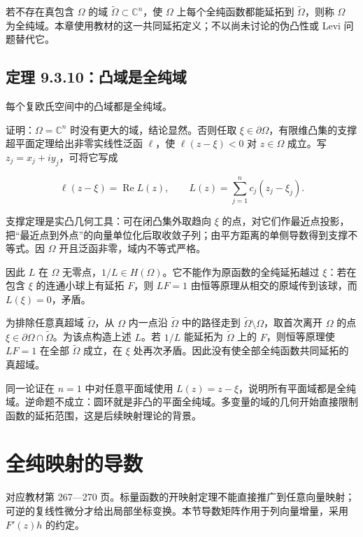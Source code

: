 \documentclass[11pt,a4paper]{article}
\begin{document}
若不存在真包含 \(\Omega\) 的域
\(\widetilde\Omega\subset\mathbb C^n\)，使 \(\Omega\)
上每个全纯函数都能延拓到 \(\widetilde\Omega\)，则称 \(\Omega\)
为全纯域。本章使用教材的这一共同延拓定义；不以尚未讨论的伪凸性或 Levi
问题替代它。

\subsection{定理 9.3.10：凸域是全纯域}\label{ch09-s3-heading-10}

每个复欧氏空间中的凸域都是全纯域。

证明：\(\Omega=\mathbb C^n\) 时没有更大的域，结论显然。否则任取
\(\xi\in\partial\Omega\)，有限维凸集的支撑超平面定理给出非零实线性泛函
\(\ell\)，使 \(\ell(z-\xi)<0\) 对 \(z\in\Omega\) 成立。写
\(z_j=x_j+iy_j\)，可将它写成

\[
\ell(z-\xi)=\operatorname{Re}L(z),\qquad
L(z)=\sum_{j=1}^nc_j(z_j-\xi_j).
\]

支撑定理是实凸几何工具：可在闭凸集外取趋向 \(\xi\)
的点，对它们作最近点投影，把``最近点到外点''的向量单位化后取收敛子列；由平方距离的单侧导数得到支撑不等式。因
\(\Omega\) 开且泛函非零，域内不等式严格。

因此 \(L\) 在 \(\Omega\)
无零点，\(1/L\in H(\Omega)\)。它不能作为原函数的全纯延拓越过
\(\xi\)：若在包含 \(\xi\) 的连通小球上有延拓 \(F\)，则 \(LF=1\)
由恒等原理从相交的原域传到该球，而 \(L(\xi)=0\)，矛盾。

为排除任意真超域 \(\widetilde\Omega\)，从 \(\Omega\) 内一点沿
\(\widetilde\Omega\) 中的路径走到
\(\widetilde\Omega\setminus\Omega\)，取首次离开 \(\Omega\) 的点
\(\xi\in\partial\Omega\cap\widetilde\Omega\)。为该点构造上述 \(L\)。若
\(1/L\) 能延拓为 \(\widetilde\Omega\) 上的 \(F\)，则恒等原理使 \(LF=1\)
在全部 \(\widetilde\Omega\) 成立，在 \(\xi\)
处再次矛盾。因此没有使全部全纯函数共同延拓的真超域。

同一论证在 \(n=1\) 中对任意平面域使用
\(L(z)=z-\xi\)，说明所有平面域都是全纯域。逆命题不成立：圆环就是非凸的平面全纯域。多变量的域的几何开始直接限制函数的延拓范围，这是后续映射理论的背景。

\section{全纯映射的导数}
\hypertarget{chapter9-part-4}{}
\par
对应教材第 267---270
页。标量函数的开映射定理不能直接推广到任意向量映射；可逆的复线性微分才给出局部坐标变换。本节导数矩阵作用于列向量增量，采用
\(F'(z)h\) 的约定。
\end{document}
